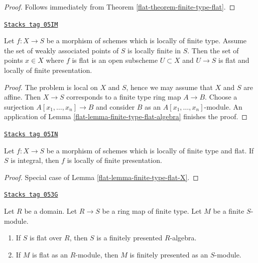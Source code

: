 \begin{proof}

Follows immediately from
Theorem \ref{flat-theorem-finite-type-flat}.
\end{proof}

\begin{lemma}
\label{flat-lemma-finite-type-flat-X}
\href{https://stacks.math.columbia.edu/tag/05IM}{\texttt{Stacks tag 05IM}}

Let $f : X \to S$ be a morphism of schemes which is locally of finite
type. Assume the set of weakly associated points of $S$ is locally finite
in $S$. Then the set of points $x \in X$ where $f$ is flat is an open
subscheme $U \subset X$ and $U \to S$ is flat and locally of finite
presentation.
\end{lemma}

\begin{proof}

The problem is local on $X$ and $S$, hence we may assume that
$X$ and $S$ are affine. Then $X \to S$ corresponds to a finite type
ring map $A \to B$. Choose a surjection $A[x_1, \ldots, x_n] \to B$
and consider $B$ as an $A[x_1, \ldots, x_n]$-module. An application of
Lemma \ref{flat-lemma-finite-type-flat-algebra}
finishes the proof.
\end{proof}

\begin{lemma}
\label{flat-lemma-finite-type-flat-over-integral}
\href{https://stacks.math.columbia.edu/tag/05IN}{\texttt{Stacks tag 05IN}}

Let $f : X \to S$ be a morphism of schemes which is
locally of finite type and flat. If $S$ is integral, then $f$
is locally of finite presentation.
\end{lemma}

\begin{proof}

Special case of
Lemma \ref{flat-lemma-finite-type-flat-X}.
\end{proof}

\begin{proposition}
\label{flat-proposition-flat-finite-type-finite-presentation-domain}
\href{https://stacks.math.columbia.edu/tag/053G}{\texttt{Stacks tag 053G}}

Let $R$ be a domain. Let $R \to S$ be a ring map of finite type.
Let $M$ be a finite $S$-module.
\begin{enumerate}
\item If $S$ is flat over $R$, then $S$ is a finitely presented $R$-algebra.
\item If $M$ is flat as an $R$-module, then $M$ is finitely presented
as an $S$-module.
\end{enumerate}
\end{proposition}

